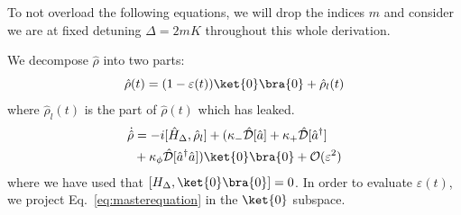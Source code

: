 To not overload the following equations, we will drop the indices $m$ and consider we are at fixed detuning $\Delta = 2mK$ throughout this whole derivation.

We decompose $\hat \rho$ into two parts:
\begin{equation}
    \hat \rho(t) = (1-\varepsilon(t))\ket{0}\bra{0} + \hat \rho_l(t)
\end{equation}
where $\hat \rho_l(t)$ is the part of $\hat \rho(t)$ which has leaked. 
\begin{equation}
    \begin{split}
        \dot{\hat \rho} &= -i [\hat H_\Delta,\hat \rho_l] + ( \kappa_- \mathcal{\hat D}[\hat a] + \kappa_+ \mathcal{\hat D}[\hat a^\dagger] \\
        & + \kappa_\phi \mathcal{\hat D}[\hat a^\dagger \hat a] )\ket{0}\bra{0} + \mathcal{O}(\varepsilon^2)
        \label{eq:masterequation}
    \end{split}
\end{equation}
where we have used that $[H_\Delta,\ket{0}\bra{0}]=0$. In order to evaluate $\varepsilon(t)$, we project Eq.~\eqref{eq:masterequation} in the $\ket{0}$ subspace.

